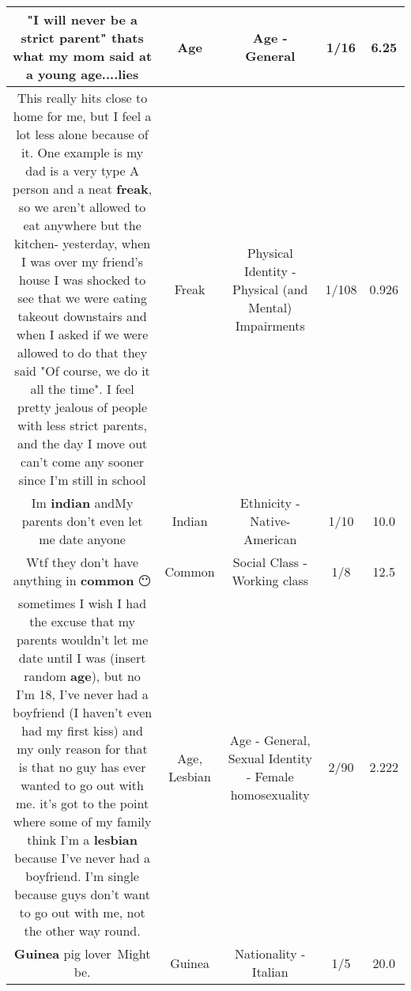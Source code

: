 \documentclass[11pt]{article}
\newlength\mylength
\begin{document}
\begin{center}
\begin{longtable}{|C{.65\mylength}|C{.30\mylength}|C{.12\mylength}|C{.12\mylength}|C{.12\mylength}|}
  \small "I will never be a strict parent" thats what my mom said at a young \textbf{age}....lies\normalsize   & Age & Age - General & 1/16 & 6.25 \\  \hline
  \small This really hits close to home for me, but I feel a lot less alone because of it. One example is my dad is a very type A person and a neat \textbf{freak}, so we aren't allowed to eat anywhere but the kitchen- yesterday, when I was over my friend's house I was shocked to see that we were eating takeout downstairs and when I asked if we were allowed to do that they said "Of course, we do it all the time". I feel pretty jealous of people with less strict parents, and the day I move out can't come any sooner since I'm still in school\normalsize   & Freak & Physical Identity - Physical (and Mental) Impairments & 1/108 & 0.926 \\  \hline
  \small Im \textbf{indian} andMy parents don't even let me date anyone\normalsize   & Indian & Ethnicity - Native-American & 1/10 & 10.0 \\  \hline
  \small Wtf they don't have anything in \textbf{common} 😶\normalsize   & Common & Social Class - Working class & 1/8 & 12.5 \\  \hline
  \small sometimes I wish I had the excuse that my parents wouldn't let me date until I was (insert random \textbf{age}), but no I'm 18, I've never had a boyfriend (I haven't even had my first kiss) and my only reason for that is that no guy has ever wanted to go out with me. it's got to the point where some of my family think I'm a \textbf{lesbian} because I've never had a boyfriend. I'm single because guys don't want to go out with me, not the other way round.\normalsize   & Age, Lesbian & Age - General, Sexual Identity - Female homosexuality & 2/90 & 2.222 \\  \hline
  \small \@\textbf{Guinea} pig lover Might be.\normalsize   & Guinea & Nationality - Italian & 1/5 & 20.0 \\  \hline

\end{longtable}
\end{center}
\end{document}
